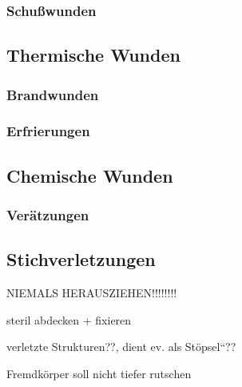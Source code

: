 \subsubsection{Schußwunden}\label{topic:schusswunden}




\subsection{Thermische
Wunden}\label{topic:wunden-thermische}

\subsubsection{Brandwunden}\label{topic:brandwunden}

\subsubsection{Erfrierungen}\label{topic:erfrierungen}

\subsection{Chemische
Wunden}\label{topic:wunden-chemische}

\subsubsection{Verätzungen}\label{topic:veraetzungen}



\subsection{Stichverletzungen}

NIEMALS  HERAUSZIEHEN!!!!!!!!

steril abdecken + fixieren

verletzte Strukturen??, dient ev. als 
{\quotedblbase}St\"opsel{\textquotedblleft}??

Fremdk\"orper soll nicht tiefer rutschen




